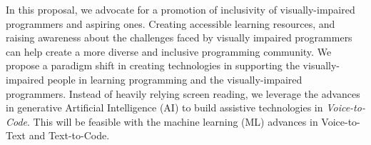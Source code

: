 In this proposal, we advocate for a promotion of inclusivity of
visually-impaired programmers and aspiring ones. Creating accessible
learning resources, and raising awareness about the challenges faced
by visually impaired programmers can help create a more diverse and
inclusive programming community. We propose a paradigm shift in
creating technologies in supporting the visually-impaired people in
learning programming and the visually-impaired programmers. Instead of
heavily relying screen reading, we leverage the advances in generative
Artificial Intelligence (AI) to build assistive technologies in {\em
Voice-to-Code}. This will be feasible with the machine learning (ML)
advances in Voice-to-Text and Text-to-Code.




